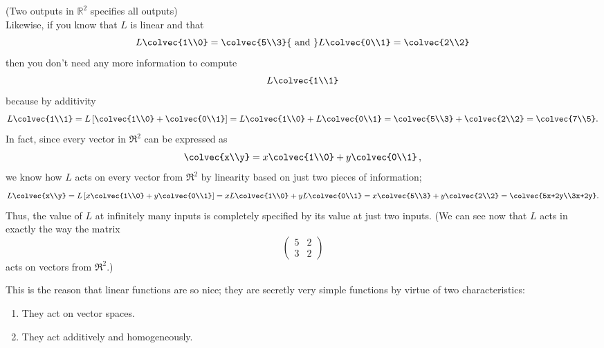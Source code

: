 \begin{example}(Two outputs in $\mathbb{R}^2$ specifies all outputs)\\
Likewise, if you  know that $L$ is linear and that
$$
L\colvec{1\\0}=\colvec{5\\3} {\rm ~and~} L\colvec{0\\1}= \colvec{2\\2}
$$ 
then you don't need any more information to compute
$$L\colvec{1\\1}$$ because by additivity
$$
L\colvec{1\\1}= L \left[ \colvec{1\\0} + \colvec{0\\1} \right] 
=L\colvec{1\\0} + L \colvec{0\\1} = \colvec{5\\3} +\colvec{2\\2} =\colvec{7\\5}.
$$
In fact, since every vector in $\Re^2$ can be expressed as 
$$
\colvec{x\\y}= x\colvec{1\\0}+y\colvec{0\\1}\, ,
$$ 
we know how $L$ acts on every vector from 
$\Re^2$ by linearity based on just  two pieces of information;
$$
L\colvec{x\\y}
= L \left[ x\colvec{1\\0}+y\colvec{0\\1} \right]
= x L\colvec{1\\0}+y L\colvec{0\\1} 
= x \colvec{5\\3}+ y\colvec{2\\2} =\colvec{5x+2y\\3x+2y}.
$$
Thus, the value of $L$ at infinitely many inputs is completely specified by its value at just two inputs.
(We can see now that $L$ acts in exactly the way the matrix 
$$
\begin{pmatrix}
5&2\\
3&2 \end{pmatrix}
$$
acts on vectors from $\Re^2$.)
\end{example}


This is the reason that linear functions are so nice;
they are secretly very simple functions by virtue of two characteristics:
\begin{enumerate}\item They act on vector spaces.
\item They act additively and homogeneously. 
\end{enumerate}


